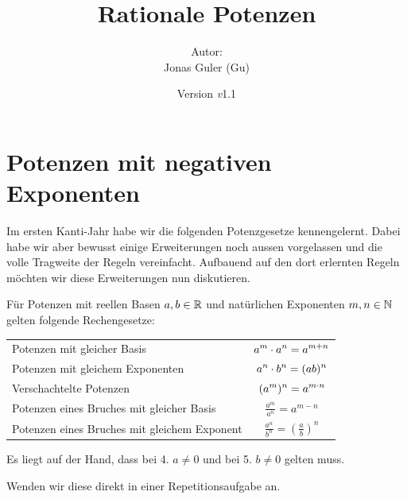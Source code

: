 \documentclass[11pt,oneside]{article}
\newcommand{\Skriptname}{Rationale Potenzen}
\newcommand{\Autor}{Jonas Guler (Gu)}
\newcommand{\version}{\textit{v}1.1}
\begin{document}
\begin{titlepage}
	\clearpage
	\title{\Huge\textbf{\Skriptname} \\[1cm]}
	\author{Autor:\\ \Autor}
	\date{\normalsize {Version \version}\\ \datelong}
	\maketitle
	\thispagestyle{empty}
	\vfill
	\tableofcontents
\end{titlepage}
\section{Potenzen mit negativen Exponenten}
	Im ersten Kanti-Jahr habe wir die folgenden Potenzgesetze kennengelernt. Dabei habe wir aber bewusst einige Erweiterungen noch aussen vorgelassen und die volle Tragweite der Regeln vereinfacht. Aufbauend auf den dort erlernten Regeln möchten wir diese Erweiterungen nun diskutieren.
	\begin{satz}
		Für Potenzen mit reellen Basen $a,b\in\mathbb{R}$ und natürlichen Exponenten $m,n\in\mathbb{N} $ gelten folgende Rechengesetze:
		\begingroup
		\renewcommand{\arraystretch}{2}
		\begin{table}[H]
			\centering
			\begin{tabular}{p{9cm} c}
				Potenzen mit gleicher Basis & $\displaystyle a^{m}\cdot a^{n}=a^{m+n}$ \\
				Potenzen mit gleichem Exponenten & $\displaystyle a^{n}\cdot b^{n}=(ab)^n$ \\
				Verschachtelte Potenzen & $\displaystyle(a^{m})^{n}=a^{m\cdot n}$ \\
				Potenzen eines Bruches mit gleicher Basis & $\displaystyle\frac{a^m}{a^n}=a^{m-n}$ \\
				Potenzen eines Bruches mit gleichem Exponent & $\displaystyle\frac{a^n}{b^n}=\left(\frac{a}{b}\right)^n$ \\
			\end{tabular}
		\end{table}
		\endgroup
		Es liegt auf der Hand, dass bei 4. $a\neq0$ und bei 5. $b\neq0$ gelten muss.
	\end{satz}
	Wenden wir diese direkt in einer Repetitionsaufgabe an.
\end{document}
